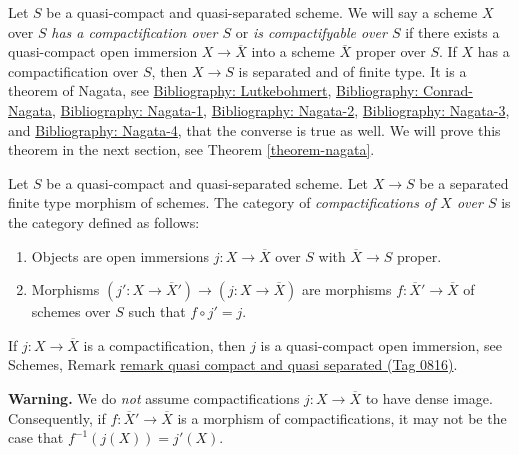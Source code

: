 \documentclass{amsart}
\theoremstyle{plain}
\theoremstyle{definition}
\theoremstyle{remark}
\numberwithin{equation}{subsection}
\begin{document}
\noindent
Let $S$ be a quasi-compact and quasi-separated scheme. We will say a
scheme $X$ over $S$ {\it has a compactification over $S$}
or {\it is compactifyable over $S$} if there exists
a quasi-compact open immersion $X \to \overline{X}$ into a scheme
$\overline{X}$ proper over $S$. If $X$ has a compactification over
$S$, then $X \to S$ is separated and of finite type. It is a theorem of
Nagata, see \href{https://stacks.math.columbia.edu/bibliography}{Bibliography: Lutkebohmert}, \href{https://stacks.math.columbia.edu/bibliography}{Bibliography: Conrad-Nagata}, \href{https://stacks.math.columbia.edu/bibliography}{Bibliography: Nagata-1},
\href{https://stacks.math.columbia.edu/bibliography}{Bibliography: Nagata-2}, \href{https://stacks.math.columbia.edu/bibliography}{Bibliography: Nagata-3}, and \href{https://stacks.math.columbia.edu/bibliography}{Bibliography: Nagata-4},
that the converse is true as well. We will prove this theorem
in the next section, see Theorem \ref{theorem-nagata}.

\medskip\noindent
Let $S$ be a quasi-compact and quasi-separated scheme.
Let $X \to S$ be a separated finite type morphism of schemes. The category
of {\it compactifications of $X$ over $S$} is the category defined
as follows:
\begin{enumerate}
\item Objects are open immersions $j : X \to \overline{X}$ over $S$ with
$\overline{X} \to S$ proper.
\item Morphisms $(j' : X \to \overline{X}') \to (j : X \to \overline{X})$
are morphisms $f : \overline{X}' \to \overline{X}$ of schemes over $S$
such that $f \circ j' = j$.
\end{enumerate}
If $j : X \to \overline{X}$ is a compactification, then $j$ is a
quasi-compact open immersion, see
Schemes, Remark \href{https://stacks.math.columbia.edu/tag/0816}{remark quasi compact and quasi separated (Tag 0816)}.

\medskip\noindent
{\bf Warning.} We do {\it not} assume compactifications $j : X \to \overline{X}$
to have dense image. Consequently, if $f : \overline{X}' \to \overline{X}$
is a morphism of compactifications, it may not be the case that
$f^{-1}(j(X)) = j'(X)$.
\end{document}

